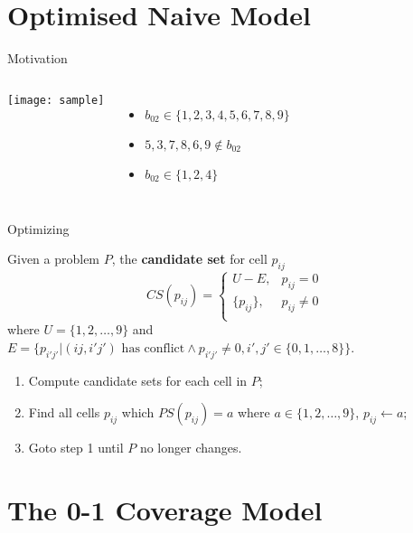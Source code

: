 \documentclass[11pt]{beamer}
\theoremstyle{definition}
\begin{document}
\section{Optimised Naive Model}

\begin{frame}{Motivation}
    \begin{columns}
        \begin{center}
            \texttt{[image: sample]}
        \end{center}
        \begin{itemize}
            \item $b_{02} \in \{1, 2, 3, 4, 5, 6, 7, 8, 9\}$
            \item<2-> $5, 3, 7, 8, 6, 9 \not\in b_{02}$
            \item<3-> $b_{02} \in \{1, 2, 4\}$
        \end{itemize}
    \end{columns}
\end{frame}

\begin{frame}{Optimizing}
    \begin{definition}
        Given a problem $P$, the \textbf{candidate set} for cell $p_{ij}$ $$CS(p_{ij}) = \left\{
            \begin{array}{ll}
                U - E, & p_{ij}=0 \\
                \{p_{ij}\}, & p_{ij} \not=0 \\
            \end{array}
        \right.$$ where $U=\{1, 2, \ldots, 9\}$ and $E=\{p_{i'j'} \lvert (ij, i'j') \mbox{ has conflict} \wedge p_{i'j'} \not=0, i', j' \in \{0, 1, \ldots, 8\}\}$.
    \end{definition}
    \pause
    \begin{enumerate}
        \item Compute candidate sets for each cell in $P$;
        \item Find all cells $p_{ij}$ which $PS(p_{ij})={a}$ where $a \in \{1, 2, \ldots, 9\}$, $p_{ij} \leftarrow a$;
        \item Goto step 1 until $P$ no longer changes.
    \end{enumerate}
\end{frame}

\section{The 0-1 Coverage Model}
\end{document}
